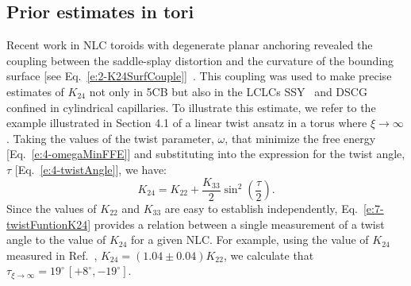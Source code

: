 \subsection{Prior estimates in tori}
Recent work in NLC toroids with degenerate planar anchoring revealed the coupling between the saddle-splay distortion and the curvature of the bounding surface [see Eq.~\ref{e:2-K24SurfCouple}]~\cite{RN24,RN59}.
This coupling was used to make precise estimates of $K_{24}$ not only in 5CB but also in the LCLCs SSY~\cite{RN191,RN293} and DSCG~\cite{RN293} confined in cylindrical capillaries.
To illustrate this estimate, we refer to the example illustrated in Section 4.1 of a linear twist ansatz in a torus where $\xi \rightarrow \infty$.
Taking the values of the twist parameter, $\omega$, that minimize the free energy [Eq.~\ref{e:4-omegaMinFFE}] and substituting into the expression for the twist angle, $\tau$ [Eq.~\ref{e:4-twistAngle}], we have:
\begin{equation}
  K_{24} = K_{22} + \frac{K_{33}}{2}\sin ^2 \left( \frac{\tau}{2} \right ).\label{e:7-twistFuntionK24}
\end{equation}
Since the values of $K_{22}$ and $K_{33}$ are easy to establish independently, Eq.~\ref{e:7-twistFuntionK24} provides a relation between a single measurement of a twist angle to the value of $K_{24}$ for a given NLC.
For example, using the value of $K_{24}$ measured in Ref.~\cite{RN24}, $K_{24} = (1.04 \pm 0.04) K_{22}$, we calculate that $\tau_{\xi \rightarrow \infty} = 19^{\circ} \, [+ 8^{\circ}, - 19^{\circ}]$.

